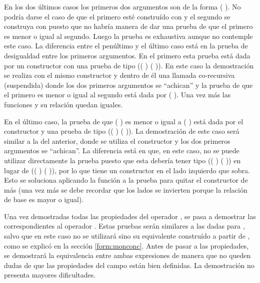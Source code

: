 \begin{AgdaAlign}
En los dos últimos casos los primeros dos argumentos son de la forma ( ). No podría darse el caso de que el primero esté construído con  y el segundo se construya con  puesto que no habría manera de dar una prueba de que el primero es menor o igual al segundo. Luego la prueba es exhaustiva aunque no contemple este caso. La diferencia entre el penúltimo y el último caso está en la prueba de desigualdad entre los primeros argumentos. En el primero esta prueba está dada por un constructor  con una prueba  de tipo \AgdaFunction{$\infty$} ((\AgdaField{$\flat$} )  (\AgdaField{$\flat$} )). En este caso la demostración se realiza con el mismo constructor y dentro de él una llamada co-recursiva (suspendida) donde los dos primeros argumentos se ``achican'' y la prueba de que el primero es menor o igual al segundo está dada por (\AgdaField{$\flat$} ). Una vez más las funciones y su relación quedan iguales. 

En el último caso, la prueba de que ( ) es menor o igual a ( ) está dada por el constructor  y una prueba  de tipo (( )  (\AgdaField{$\flat$} )). La demostración de este caso será similar a la del anterior, donde se utiliza el constructor  y los dos primeros argumentos se ``achican''. La diferencia está en que, en este caso, no se puede utilizar directamente la prueba  puesto que esta debería tener tipo ((\AgdaField{$\flat$} )  (\AgdaField{$\flat$} )) en lugar de (( )  (\AgdaField{$\flat$} )), por lo que tiene un constructor  en el lado izquierdo que sobra. Esto se soluciona aplicando la función  a la prueba para quitar el constructor de más (una vez más se debe recordar que los lados se invierten porque la relación de base es mayor o igual).

Una vez demostradas todas las propiedades del operador , se pasa a demostrar las correspondientes al operador . Estas pruebas serán similares a las dadas para , salvo que en este caso no se utilizará  sino su equivalente construído a partir de , como se explicó en la sección \ref{form:monconc}. Antes de pasar a las propiedades, se demostrará la equivalencia entre ambas expresiones de manera que no queden dudas de que las propiedades del campo  están bien definidas. La demostración no presenta mayores dificultades.


\end{AgdaAlign}
